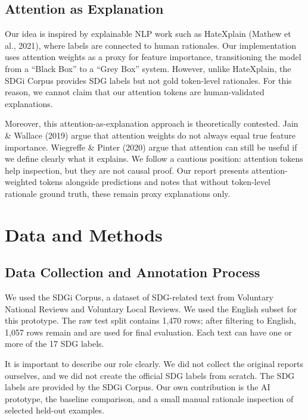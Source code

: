 \documentclass[12pt,a4paper]{article}
\begin{document}
\subsection{Attention as Explanation}

Our idea is inspired by explainable NLP work such as HateXplain (Mathew et al., 2021), where labels are connected to human rationales. Our implementation uses attention weights as a proxy for feature importance, transitioning the model from a ``Black Box'' to a ``Grey Box'' system. However, unlike HateXplain, the SDGi Corpus provides SDG labels but not gold token-level rationales. For this reason, we cannot claim that our attention tokens are human-validated explanations.

Moreover, this attention-as-explanation approach is theoretically contested. Jain \& Wallace (2019) argue that attention weights do not always equal true feature importance. Wiegreffe \& Pinter (2020) argue that attention can still be useful if we define clearly what it explains. We follow a cautious position: attention tokens help inspection, but they are not causal proof. Our report presents attention-weighted tokens alongside predictions and notes that without token-level rationale ground truth, these remain proxy explanations only.

\section{Data and Methods}

\subsection{Data Collection and Annotation Process}

We used the SDGi Corpus, a dataset of SDG-related text from Voluntary National Reviews and Voluntary Local Reviews. We used the English subset for this prototype. The raw test split contains 1,470 rows; after filtering to English, 1,057 rows remain and are used for final evaluation. Each text can have one or more of the 17 SDG labels.

It is important to describe our role clearly. We did not collect the original reports ourselves, and we did not create the official SDG labels from scratch. The SDG labels are provided by the SDGi Corpus. Our own contribution is the AI prototype, the baseline comparison, and a small manual rationale inspection of selected held-out examples.
\end{document}
